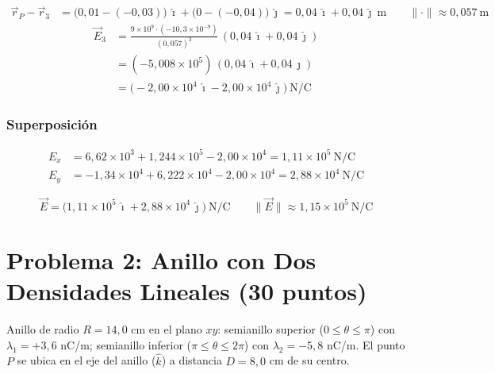 \documentclass[12pt,letterpaper]{article}
\begin{document}
\begin{align*}
    \vec{r}_P - \vec{r}_3 &= \bigl(0{,}01-(-0{,}03)\bigr)\,\hat{\imath} + \bigl(0-(-0{,}04)\bigr)\,\hat{\jmath}
        = 0{,}04\,\hat{\imath} + 0{,}04\,\hat{\jmath}\ \text{m}
        \qquad \|\cdot\| \approx 0{,}057\ \text{m}
\end{align*}
\begin{align*}
    \vec{E}_3 &= \frac{9\times10^9\cdot(-10{,}3\times10^{-9})}{(0{,}057)^3}
               \,(0{,}04\,\hat{\imath}+0{,}04\,\hat{\jmath})\\
              &= (-5{,}008\times10^5)\,(0{,}04\,\hat{\imath}+0{,}04\,\hat{\jmath})\\
              &= \bigl(-2{,}00\times10^{4}\,\hat{\imath} - 2{,}00\times10^{4}\,\hat{\jmath}\bigr)\ \text{N/C}
\end{align*}

\subsubsection*{Superposición}

\begin{align*}
    E_x &= 6{,}62\times10^3 + 1{,}244\times10^5 - 2{,}00\times10^4 = 1{,}11\times10^5\ \text{N/C}\\
    E_y &= -1{,}34\times10^4 + 6{,}222\times10^4 - 2{,}00\times10^4 = 2{,}88\times10^4\ \text{N/C}
\end{align*}

\[
\boxed{\vec{E} = \bigl(1{,}11\times10^5\,\hat{\imath} + 2{,}88\times10^4\,\hat{\jmath}\bigr)\ \text{N/C}
\qquad \|\vec{E}\| \approx 1{,}15\times10^5\ \text{N/C}}
\]

\newpage
\section*{Problema 2: Anillo con Dos Densidades Lineales (30 puntos)}

Anillo de radio $R = 14{,}0$ cm en el plano $xy$: semianillo superior ($0\leq\theta\leq\pi$)
con $\lambda_1 = +3{,}6$ nC/m; semianillo inferior ($\pi\leq\theta\leq2\pi$) con
$\lambda_2 = -5{,}8$ nC/m. El punto $P$ se ubica en el eje del anillo ($\hat{k}$) a
distancia $D = 8{,}0$ cm de su centro.
\end{document}
